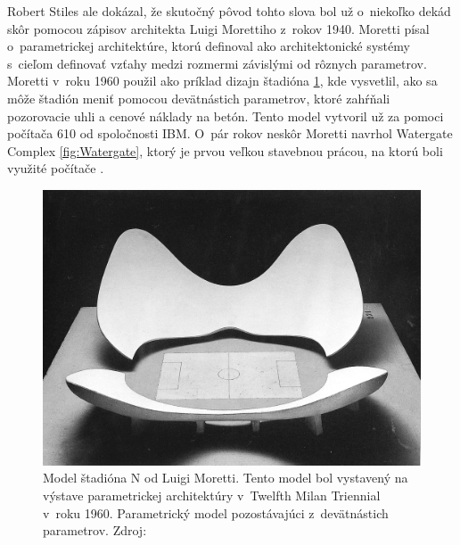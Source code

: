 Robert Stiles ale dokázal, že skutočný pôvod tohto slova bol už o~niekoľko dekád skôr pomocou zápisov architekta Luigi Morettiho z~rokov 1940.  Moretti písal o~parametrickej architektúre, ktorú definoval ako architektonické systémy s~cieľom 
definovať vzťahy medzi rozmermi závislými od rôznych parametrov.
Moretti v~roku 1960 použil ako príklad dizajn štadióna \ref{fig:morretiStadion}, kde vysvetlil, ako sa môže štadión meniť pomocou devätnástich parametrov, ktoré zahŕňali pozorovacie uhli a cenové náklady na betón. Tento model vytvoril už za pomoci počítača 610 od spoločnosti IBM\cite{doi:10.1002/ad.2019}. O~pár rokov neskôr Moretti navrhol Watergate Complex \ref{fig:Watergate}, ktorý je prvou veľkou stavebnou prácou, na ktorú boli využité počítače \cite{davis_2013}. 


\begin{figure}[H]
    \centering
    \includegraphics[width = \linewidth]{obrazky-figures/moretti_1.jpg}
    \caption{Model štadióna N od Luigi Moretti. Tento model bol vystavený na výstave parametrickej architektúry v~Twelfth Milan Triennial v~roku 1960. Parametrický model pozostávajúci z~devätnástich parametrov. Zdroj:  \cite{davis_2013}}
    \label{fig:morretiStadion}
\end{figure}


